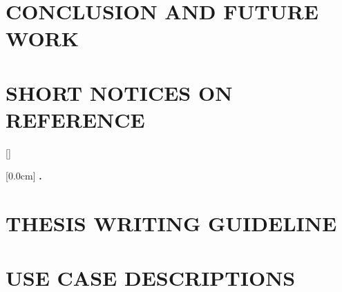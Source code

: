 \documentclass[a4paper,13pt,3p,twoside]{report}
\renewcommand{\bibname}{reference}
\renewcommand{\figurename}{Figure}
\renewcommand{\tablename}{Table}
\renewcommand{\chaptername}{CHAPTER}
\theoremstyle{definition}
\begin{document}
\chapter{CONCLUSION AND FUTURE WORK} %
\label{chapter:conclusion}


\newpage
\chapter*{SHORT NOTICES ON REFERENCE} %
\label{chapter:reference}



\newpage
\renewcommand\bibname{REFERENCE}
\printbibliography
{}

\appendixpage
\appendices
\addappheadtotoc
\renewcommand{\figurename}{Figure}
\renewcommand{\tablename}{Table}
\renewcommand{\chaptername}{CHAPTER}


{}[]
\titlespacing*{\chapter}{0pt}{-20pt}{20pt}

    [0.0cm]             %
    {\bfseries\vspace{0.3cm}}                  %
    {{\bfseries{\scshape} \thecontentslabel.\ }} %
    {}         %
    {\contentspage}         %
\chapter{THESIS WRITING GUIDELINE}

\newpage
\chapter{USE CASE DESCRIPTIONS}

\end{document}
